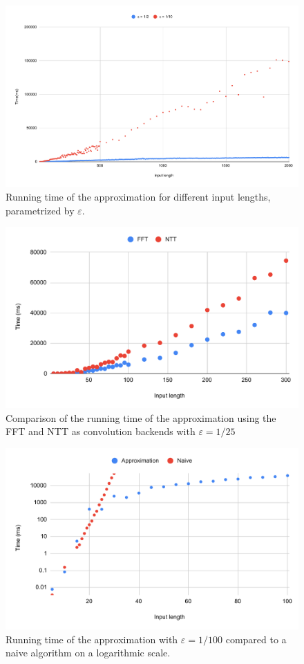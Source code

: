 \begin{figure}[h!]
    \centering
    \includegraphics[width=\linewidth]{charts/input_length.pdf}
    \caption{Running time of the approximation for different input lengths, parametrized by $\varepsilon$.}
    \label{fig:chart}
\end{figure}

\begin{figure}[h!]
    \centering
    \includegraphics[width=\linewidth]{charts/fft_ntt.pdf}
    \caption{Comparison of the running time of the approximation using the FFT and NTT as convolution backends with $\varepsilon = 1/25$  }
    \label{fig:chart}
\end{figure}

\begin{figure}[h!]
    \centering
    \includegraphics[width=\linewidth]{charts/naive.pdf}
    \caption{Running time of the approximation with $\varepsilon = 1/100$ compared to a naive algorithm on a logarithmic scale.}
    \label{fig:chart}
\end{figure}


